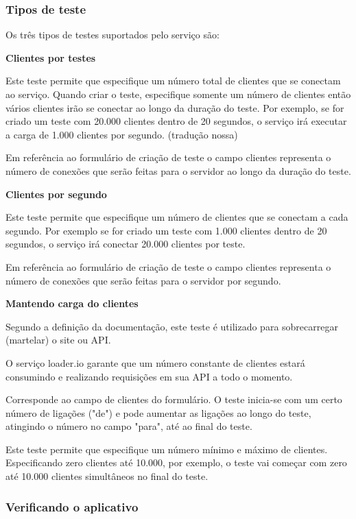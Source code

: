 \subsubsection{Tipos de teste}
  
  Os três tipos de testes suportados pelo serviço são:
  
  \textbf{Clientes por testes}
  
  Este teste permite que especifique um número total de clientes que se conectam ao serviço. Quando criar o teste,
  especifique somente um número de clientes então vários clientes irão se conectar ao longo da duração do teste. 
  Por exemplo, se for criado um teste com 20.000 clientes dentro de 20 segundos, o serviço irá executar a carga de 
  1.000 clientes por segundo. (tradução nossa)
  
  Em referência ao formulário de criação de teste o campo clientes representa o número de conexões que serão
  feitas para o servidor ao longo da duração do teste.
  
  \textbf{Clientes por segundo}
  
  Este teste permite que especifique um número de clientes que se conectam a cada segundo. Por exemplo se for criado
  um teste com 1.000 clientes dentro de 20 segundos, o serviço irá conectar 20.000 clientes por teste.
  
  Em referência ao formulário de criação de teste o campo clientes representa o número de conexões que serão
  feitas para o servidor por segundo.
  
  \textbf{Mantendo carga do clientes}
  
  Segundo a definição da documentação, este teste é utilizado para sobrecarregar (martelar) o site ou \ac{API}.
  
  O serviço loader.io garante que um número constante de clientes estará consumindo e realizando requisições em 
  sua \ac{API} a todo o momento.
  
  Corresponde ao campo de clientes do formulário. O teste inicia-se com um certo número de ligações ("de") 
  e pode aumentar as ligações ao longo do teste, atingindo o número no campo "para", até ao final do teste. 
  
  Este teste permite que especifique um número mínimo e máximo de clientes. Especificando zero clientes
  até 10.000, por exemplo, o teste vai começar com zero até 10.000 clientes simultâneos no final do teste.
  
\subsubsection{Verificando o aplicativo}

